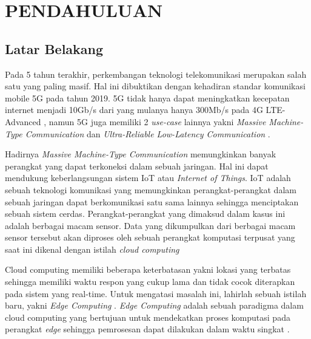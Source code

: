 \chapter{PENDAHULUAN}
\setcounter{page}{1}


\section{Latar Belakang}

Pada 5 tahun terakhir, perkembangan teknologi telekomunikasi merupakan salah satu yang paling masif.
Hal ini dibuktikan dengan kehadiran standar komunikasi mobile 5G pada tahun 2019. 5G tidak hanya dapat meningkatkan kecepatan internet menjadi
10Gb/s dari yang mulanya hanya 300Mb/s pada 4G LTE-Advanced \citep{4g}, namun 5G juga memiliki 2 \textit{use-case} lainnya
yakni \textit{Massive Machine-Type Communication} dan \textit{Ultra-Reliable Low-Latency Communication} \citep{5g}. 


Hadirnya \textit{Massive Machine-Type Communication} memungkinkan banyak perangkat yang dapat terkoneksi dalam sebuah jaringan.
Hal ini dapat mendukung keberlangsungan sistem IoT atau \textit{Internet of Things}. IoT adalah sebuah teknologi komunikasi
yang memungkinkan perangkat-perangkat dalam sebuah jaringan dapat berkomunikasi satu sama lainnya sehingga menciptakan sebuah sistem cerdas.
Perangkat-perangkat yang dimaksud dalam kasus ini adalah berbagai macam sensor. Data yang dikumpulkan dari berbagai macam sensor tersebut akan diproses
oleh sebuah perangkat komputasi terpusat yang saat ini dikenal dengan istilah \textit{cloud computing}

Cloud computing memiliki beberapa keterbatasan yakni lokasi yang terbatas sehingga memiliki waktu respon yang cukup lama
dan tidak cocok diterapkan pada sistem yang real-time. Untuk mengatasi masalah ini, lahirlah sebuah istilah baru, yakni \textit{Edge Computing} \citep{edgeCompTerm}.
\textit{Edge Computing} adalah sebuah paradigma dalam cloud computing yang bertujuan untuk mendekatkan proses komputasi pada perangkat \textit{edge}
sehingga pemrosesan dapat dilakukan dalam waktu singkat \citep{edgeComp}.

